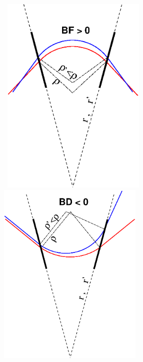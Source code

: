 \documentclass[12pt]{article}
\begin{document}
{{\begin{minipage}[b]{.5\linewidth}
~

\end{minipage}
\begin{minipage}[b]{.5\linewidth}\hspace{3mm}

\mbox{
\includegraphics*[bbllx=0,bblly=100,bburx=252,bbury=323,width=7cm]{./figs_FFAG_introSlides/geometry.eps}\hspace{-5mm}
\includegraphics*[bbllx=0,bblly=100,bburx=252,bbury=323,width=7cm]{./figs_FFAG_introSlides/geometryD.eps} 
}

~

~



\end{minipage}}}
\end{document}
